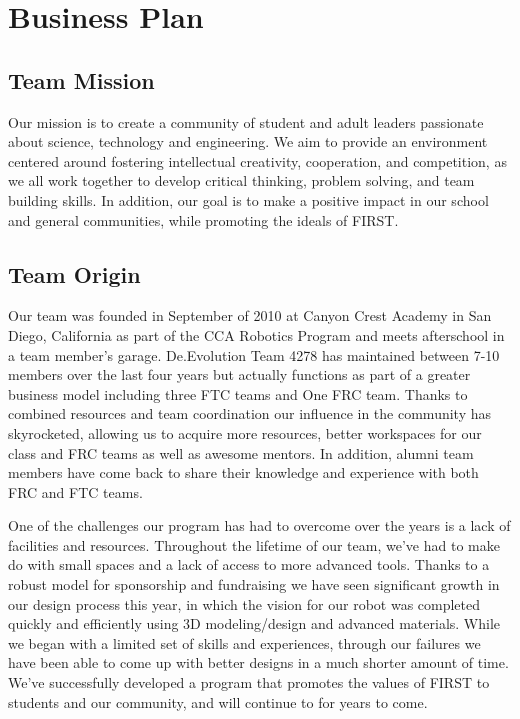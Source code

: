 	\section{Business Plan}

\subsection{Team Mission}

Our mission is to create a community of student and adult leaders passionate about science, technology and engineering. We aim to provide an environment centered around fostering intellectual creativity, cooperation, and competition, as we all work together to develop critical thinking, problem solving, and team building skills. In addition, our goal is to make a positive impact in our school and general communities, while promoting the ideals of FIRST. 

\subsection{Team Origin}

Our team was founded in September of 2010 at Canyon Crest Academy in San Diego, California as part of the CCA Robotics Program and meets afterschool in a team member’s garage. De.Evolution Team 4278 has maintained between 7-10 members over the last four years but actually functions as part of a greater business model including three FTC teams and One FRC team. Thanks to combined resources and team coordination our influence in the community has skyrocketed, allowing us to acquire more resources, better workspaces for our class and FRC teams as well as awesome mentors. In addition, alumni team members have come back to share their knowledge and experience with both FRC and FTC teams. 

One of the challenges our program has had to overcome over the years is a lack of facilities and resources. Throughout the lifetime of our team, we’ve had to make do with small spaces and a lack of access to more advanced tools. Thanks to a robust model for sponsorship and fundraising we have seen significant growth in our design process this year, in which the vision for our robot was completed quickly and efficiently using 3D modeling/design and advanced materials. While we began with a limited set of skills and experiences, through our failures we have been able to come up with better designs in a much shorter amount of time. We’ve successfully developed a program that promotes the values of FIRST to students and our community, and will continue to for years to come.

